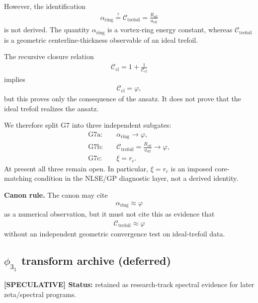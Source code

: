 However, the identification
\begin{align}
    \alpha_{\mathrm{ring}}
    \stackrel{?}{=}
    \mathcal{C}_{\mathrm{trefoil}}
    =
    \frac{R_{\mathrm{eff}}}{a_{\mathrm{eff}}}
\end{align}
is not derived. The quantity \(\alpha_{\mathrm{ring}}\) is a vortex-ring
energy constant, whereas \(\mathcal{C}_{\mathrm{trefoil}}\) is a geometric
centerline-thickness observable of an ideal trefoil.

The recursive closure relation
\begin{align}
    \mathcal{C}_{\mathrm{cl}}
    =
    1+\frac{1}{\mathcal{C}_{\mathrm{cl}}}
\end{align}
implies
\begin{align}
    \mathcal{C}_{\mathrm{cl}}=\varphi,
\end{align}
but this proves only the consequence of the ansatz. It does not prove that
the ideal trefoil realizes the ansatz.

We therefore split G7 into three independent subgates:
\begin{align}
    \mathrm{G7a}:&\quad \alpha_{\mathrm{ring}}\to\varphi,\\
    \mathrm{G7b}:&\quad
    \mathcal{C}_{\mathrm{trefoil}}
    =
    \frac{R_{\mathrm{eff}}}{a_{\mathrm{eff}}}
    \to\varphi,\\
    \mathrm{G7c}:&\quad \xi=r_c.
\end{align}
At present all three remain open. In particular, \(\xi=r_c\) is an imposed
core-matching condition in the NLSE/GP diagnostic layer, not a derived
identity.

\textbf{Canon rule.}
The canon may cite
\begin{align}
    \alpha_{\mathrm{ring}}\approx\varphi
\end{align}
as a numerical observation, but it must not cite this as evidence that
\begin{align}
    \mathcal{C}_{\mathrm{trefoil}}\approx\varphi
\end{align}
without an independent geometric convergence test on ideal-trefoil data.

\subsection{\texorpdfstring{$\phi_{3_1}$}{phi3_1} transform archive (deferred)}
\textbf{[SPECULATIVE] Status:} retained as research-track spectral evidence for later zeta/spectral programs.

